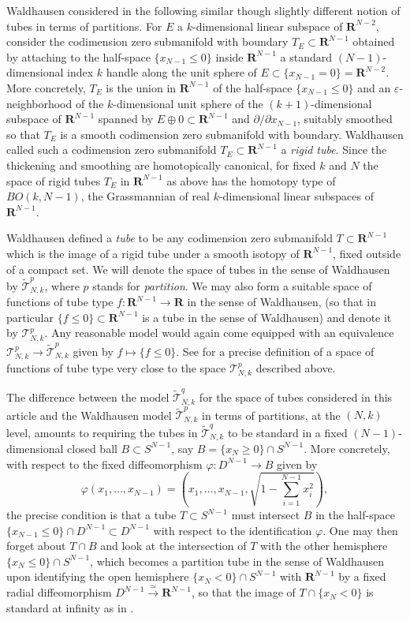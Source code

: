 \documentclass{amsart}
\newcommand\cT{\mathcal{T}}
\def\bR{\mathbf{R}}
\theoremstyle{definition}
\theoremstyle{remark}
\newtheorem{inductive lemma}[theorem]{Inductive Lemma}
\begin{document}
Waldhausen considered in \cite{W82} the following similar though slightly different notion of tubes in terms of partitions. For $E$ a $k$-dimensional linear subspace of $\bR^{N-2}$, consider the codimension zero submanifold with boundary $T_E \subset \bR^{N-1}$ obtained by attaching to the half-space $\{x_{N-1} \leq 0 \}$ inside $\bR^{N-1}$ a standard $(N-1)$-dimensional index $k$ handle along the unit sphere of $E \subset \{x_{N-1}=0\} = \bR^{N-2}$. More concretely, $T_E$ is the union in $\bR^{N-1}$ of the half-space $\{x_{N-1} \leq 0\}$ and an $\varepsilon$-neighborhood of the $k$-dimensional unit sphere of the $(k+1)$-dimensional subspace of $\bR^{N-1}$ spanned by $E \oplus 0 \subset \bR^{N-1}$ and $\partial / \partial x_{N-1}$, suitably smoothed so that $T_E$ is a smooth codimension zero submanifold with boundary. Waldhausen called such a codimension zero submanifold $T_E \subset \bR^{N-1}$ a {\it rigid tube}. Since the thickening and smoothing are homotopically canonical, for fixed $k$ and $N$ the space of rigid tubes $T_E$ in $\bR^{N-1}$ as above has the homotopy type of $BO(k,N-1)$, the Grassmannian of real $k$-dimensional linear subspaces of $\bR^{N-1}$. 

Waldhausen defined a {\em tube} to be any codimension zero submanifold $T \subset \bR^{N-1}$ which is the image of a rigid tube under a smooth isotopy of $\bR^{N-1}$, fixed outside of a compact set. We will denote the space of tubes in the sense of Waldhausen by $\widetilde{\cT}_{N,k}^p$, where $p$ stands for {\em partition}. We may also form a suitable space of functions of tube type  $f:\bR^{N-1} \to \bR$ in the sense of Waldhausen, (so that in particular  $\{f \leq 0\} \subset \bR^{N-1}$ is a tube in the sense of Waldhausen) and denote it by $\cT_{N,k}^p$. Any reasonable model would again come equipped with an equivalence $\cT_{N,k}^p \to \widetilde{\cT}_{N,k}^p$ given by $f \mapsto \{f \leq 0\}$. See \cite{ACGK} for a precise definition of a space of functions of tube type very close to the space $\cT_{N,k}^p$ described above. 


The difference between the model  $\widetilde{\cT}^q_{N,k}$ for the space of tubes considered in this article and the Waldhausen model  $\widetilde{\cT}_{N,k}^p$ in terms of partitions, at the $(N,k)$ level, amounts to requiring the tubes in  $\widetilde{\cT}^q_{N,k}$  to be standard in a fixed $(N-1)$-dimensional closed ball $B \subset S^{N-1}$, say $B=\{x_{N} \geq 0 \} \cap S^{N-1}$. More concretely, with respect to the fixed diffeomorphism $\varphi:D^{N-1} \to B$ given by $$\varphi(x_1,\ldots,x_{N-1})=\left(x_1,\ldots,x_{N-1},\sqrt{1-\sum_{i=1}^{N-1}x_i^2}\right),$$ the precise condition is that a tube $T \subset S^{N-1}$ must intersect $B$ in the half-space $\{x_{N-1} \leq 0\} \cap D^{N-1} \subset D^{N-1}$ with respect to the identification $\varphi$. One may then forget about $T \cap B$ and look at the intersection of $T$ with the other hemisphere $\{x_{N} \leq 0\} \cap S^{N-1}$, which becomes a partition tube in the sense of Waldhausen upon identifying the open hemisphere $\{x_N <0\} \cap S^{N-1}$ with $\bR^{N-1}$ by a fixed radial diffeomorphism $D^{N-1} \xrightarrow{\simeq} \bR^{N-1}$, so that the image of $T \cap \{x_N<0\}$ is standard at infinity as in \cite{W82}.
\end{document}
